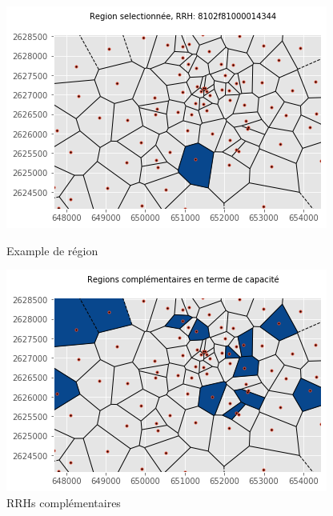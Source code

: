 \documentclass{report}
\begin{document}
\begin{figure}[H]
   \begin{minipage}{0.4\textwidth}
     \centering
     \includegraphics[scale=0.55]{images/reg_sel.png}
     \caption{Example de région }\label{Fig:Data1}
   \end{minipage}\hfill
   \begin{minipage}{0.4\textwidth}
     \centering
     \includegraphics[scale=0.55]{images/reg_comp.png}
     \caption{RRHs complémentaires}\label{Fig:Data2}
   \end{minipage}
\end{figure} 
\end{document}
